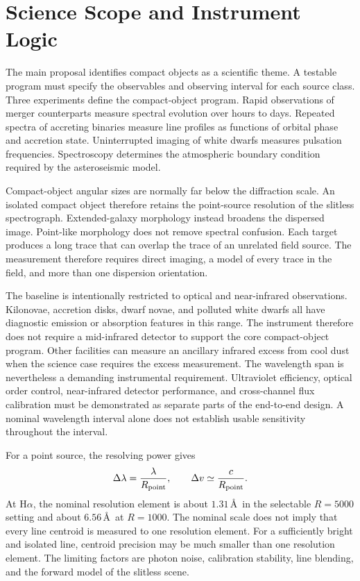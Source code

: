 \documentclass[10pt,onecolumn]{article}
\newcommand{\Rpoint}{R_{\rm point}}
\begin{document}
\section{Science Scope and Instrument Logic}

The main proposal identifies compact objects as a scientific theme. A
testable program must specify the observables and observing interval for each
source class. Three experiments define the compact-object program. Rapid
observations of merger counterparts measure spectral evolution over hours to
days. Repeated spectra of accreting binaries measure line profiles as functions
of orbital phase and accretion state. Uninterrupted imaging of white dwarfs
measures pulsation frequencies. Spectroscopy determines the atmospheric
boundary condition required by the asteroseismic model.

Compact-object angular sizes are normally far below the diffraction scale.
An isolated compact object therefore retains the point-source resolution of
the slitless spectrograph. Extended-galaxy morphology instead broadens the
dispersed image. Point-like morphology does not remove spectral confusion.
Each target produces a long trace that can overlap the trace of an unrelated
field source. The measurement therefore requires direct imaging, a model of
every trace in the field, and more than one dispersion orientation.

The baseline is intentionally restricted to optical and near-infrared
observations. Kilonovae, accretion disks, dwarf novae, and polluted white
dwarfs all have diagnostic emission or absorption features in this range.
The instrument therefore does not require a mid-infrared detector to support
the core compact-object program. Other facilities can measure an ancillary
infrared excess from cool dust when the science case requires the excess
measurement.
The wavelength span is nevertheless a demanding instrumental requirement.
Ultraviolet efficiency, optical order control, near-infrared detector
performance, and cross-channel flux calibration must be demonstrated as
separate parts of the end-to-end design. A nominal wavelength interval alone
does not establish usable sensitivity throughout the interval.

For a point source, the resolving power gives
\begin{equation}
  \Delta\lambda = \frac{\lambda}{\Rpoint},
  \qquad
  \Delta v \simeq \frac{c}{\Rpoint}.
  \label{eq:resolution}
\end{equation}
At H$\alpha$, the nominal resolution element is about $1.31$\,\AA\ in the
selectable $R=5000$ setting and about $6.56$\,\AA\ at $R=1000$. The nominal
scale does not imply that every line centroid is measured to one resolution
element.
For a sufficiently bright and isolated line, centroid precision may be much
smaller than one resolution element. The limiting factors are photon noise,
calibration stability, line blending, and the forward model of the
slitless scene.
\end{document}

